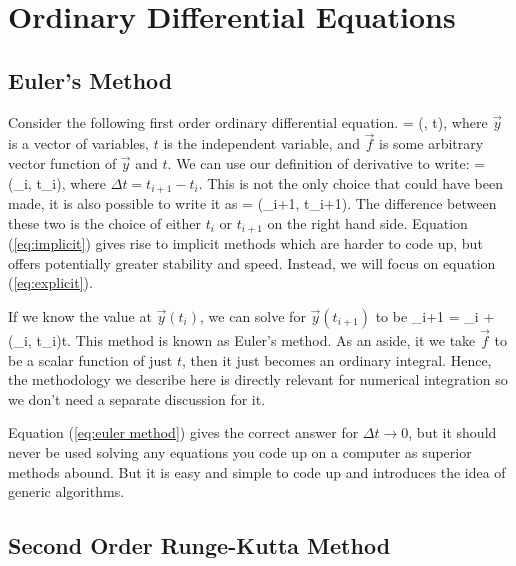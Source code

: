 \section{Ordinary Differential Equations}

\subsection{Euler's Method}

Consider the following first order ordinary differential equation.
\be
{} = (, t),
\ee
where $\vec{y}$ is a vector of variables, $t$ is the independent variable, and $\vec{f}$ is some arbitrary vector function of $\vec{y}$ and $t$.  We can use our definition of derivative to write: 
\be
{} \approx {} = (_i, t_i),\label{eq:explicit}
\ee
where $\Delta t = t_{i+1} - t_i$.  This is not the only choice that could have been made, it is also possible to write it as 
\be
{} = (_{i+1}, t_{i+1}). \label{eq:implicit}
\ee
The difference between these two is the choice of either $t_{i}$ or $t_{i+1}$ on the right hand side.  Equation (\ref{eq:implicit}) gives rise to implicit methods which are harder to code up, but offers potentially greater stability and speed.  Instead, we will focus on equation (\ref{eq:explicit}).  

If we know the value at $\vec{y}(t_i)$, we can solve for $\vec{y}(t_{i+1})$ to be
\be
{}_{i+1} = _i + (_i, t_i)\Delta t.\label{eq:euler method}
\ee
This method is known as Euler's method.  As an aside, it we take $\vec{f}$ to be a scalar function of just $t$, then it just becomes an ordinary integral.  Hence, the methodology we describe here is directly relevant for numerical integration so we don't need a separate discussion for it.

Equation (\ref{eq:euler method}) gives the correct answer for $\Delta t \rightarrow 0$, but it should never be used solving any equations you code up on a computer as superior methods abound. But it is easy and simple to code up and introduces the idea of generic algorithms.  

\subsection{Second Order Runge-Kutta Method}

